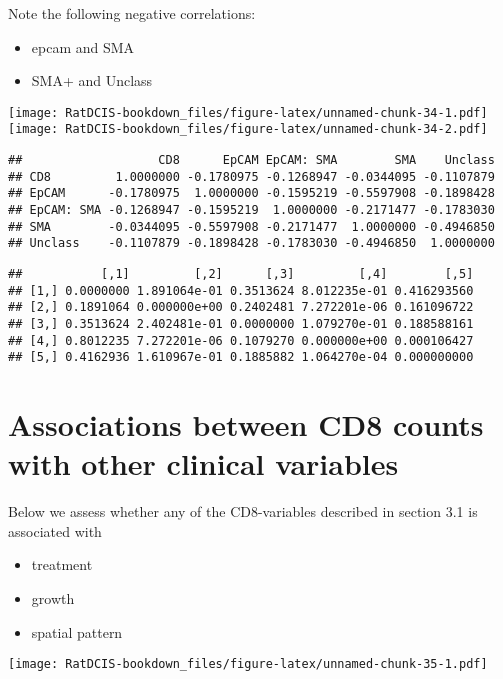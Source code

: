 \documentclass[
]{book}
\providecommand{\tightlist}{%
  \setlength{\itemsep}{0pt}\setlength{\parskip}{0pt}}
\begin{document}
Note the following negative correlations:

\begin{itemize}
\tightlist
\item
  epcam and SMA
\item
  SMA+ and Unclass
\end{itemize}

\texttt{[image: RatDCIS-bookdown\_files/figure-latex/unnamed-chunk-34-1.pdf]} \texttt{[image: RatDCIS-bookdown\_files/figure-latex/unnamed-chunk-34-2.pdf]}

\begin{verbatim}
##                   CD8      EpCAM EpCAM: SMA        SMA    Unclass
## CD8         1.0000000 -0.1780975 -0.1268947 -0.0344095 -0.1107879
## EpCAM      -0.1780975  1.0000000 -0.1595219 -0.5597908 -0.1898428
## EpCAM: SMA -0.1268947 -0.1595219  1.0000000 -0.2171477 -0.1783030
## SMA        -0.0344095 -0.5597908 -0.2171477  1.0000000 -0.4946850
## Unclass    -0.1107879 -0.1898428 -0.1783030 -0.4946850  1.0000000
\end{verbatim}

\begin{verbatim}
##           [,1]         [,2]      [,3]         [,4]        [,5]
## [1,] 0.0000000 1.891064e-01 0.3513624 8.012235e-01 0.416293560
## [2,] 0.1891064 0.000000e+00 0.2402481 7.272201e-06 0.161096722
## [3,] 0.3513624 2.402481e-01 0.0000000 1.079270e-01 0.188588161
## [4,] 0.8012235 7.272201e-06 0.1079270 0.000000e+00 0.000106427
## [5,] 0.4162936 1.610967e-01 0.1885882 1.064270e-04 0.000000000
\end{verbatim}

\hypertarget{associations-between-cd8-counts-with-other-clinical-variables}{%
\section{Associations between CD8 counts with other clinical variables}\label{associations-between-cd8-counts-with-other-clinical-variables}}

Below we assess whether any of the CD8-variables described in section 3.1 is associated with

\begin{itemize}
\tightlist
\item
  treatment
\item
  growth
\item
  spatial pattern
\end{itemize}

\texttt{[image: RatDCIS-bookdown\_files/figure-latex/unnamed-chunk-35-1.pdf]}
\end{document}
